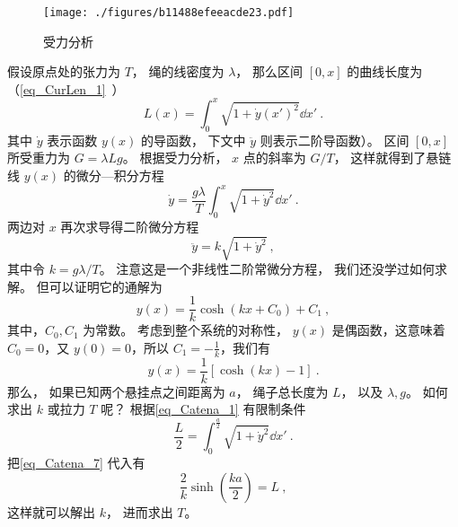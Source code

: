 \begin{figure}[ht]
\centering
\texttt{[image: ./figures/b11488efeeacde23.pdf]}
\caption{受力分析} \label{fig_Catena_2}
\end{figure}
假设原点处的张力为 $T$， 绳的线密度为 $\lambda$， 那么区间 $[0, x]$ 的曲线长度为（\autoref{eq_CurLen_1}~）
\begin{equation}\label{eq_Catena_1}
L(x) = \int_0^x \sqrt{1 + \dot y(x')^2} \dd{x'}~.
\end{equation}
其中 $\dot y$ 表示函数 $y(x)$ 的导函数， 下文中 $\ddot y$ 则表示二阶导函数）。 区间 $[0, x]$ 所受重力为 $G = \lambda L g$。 根据受力分析， $x$ 点的斜率为 $G/T$， 这样就得到了悬链线 $y(x)$ 的微分—积分方程
\begin{equation}
\dot y = \frac{g\lambda}{T} \int_0^x \sqrt{1 + \dot y^2} \dd{x'}~.
\end{equation}
两边对 $x$ 再次求导得二阶微分方程
\begin{equation}
\ddot y = k \sqrt{1 + \dot y^2}~,
\end{equation}
其中令 $k = g\lambda/T$。 注意这是一个非线性二阶常微分方程， 我们还没学过如何求解。 但可以证明它的通解为
\begin{equation}\label{eq_Catena_2}
y(x) = \frac{1}{k}\cosh(kx+C_0)+C_1~,
\end{equation}
其中，$C_0,C_1$ 为常数。
考虑到整个系统的对称性， $y(x)$ 是偶函数，这意味着 $C_0=0$，又 $y(0)=0$，所以 $C_1=-\frac{1}{k}$，我们有
\begin{equation}\label{eq_Catena_7}
y(x)=\frac{1}{k}[\cosh(kx)-1]~.
\end{equation}
那么， 如果已知两个悬挂点之间距离为 $a$， 绳子总长度为 $L$， 以及 $\lambda, g$。 如何求出 $k$ 或拉力 $T$ 呢？ 根据\autoref{eq_Catena_1} 有限制条件
\begin{equation}
\frac{L}{2} = \int_{0}^{\frac{a}{2}} \sqrt{1 + \dot y^2} \dd{x'}~.
\end{equation}
把\autoref{eq_Catena_7} 代入有
\begin{equation}
\frac{2}{k}\sinh(\frac{ka}{2}) = L~,
\end{equation}
这样就可以解出 $k$， 进而求出 $T$。

